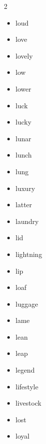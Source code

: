 \documentclass[../../book.tex]{subfiles}
\begin{document}
\begin{multicols}{2}
\begin{itemize}
\item[-] loud
\item[-] love
\item[-] lovely
\item[-] low
\item[-] lower
\item[-] luck
\item[-] lucky
\item[-] lunar
\item[-] lunch
\item[-] lung
\item[-] luxury
\item[-] latter
\item[-] laundry
\item[-] lid
\item[-] lightning
\item[-] lip
\item[-] loaf
\item[-] luggage
\item[-] lame
\item[-] lean
\item[-] leap
\item[-] legend
\item[-] lifestyle
\item[-] livestock
\item[-] lost
\item[-] loyal
\end{itemize}
\end{multicols}
\end{document}
